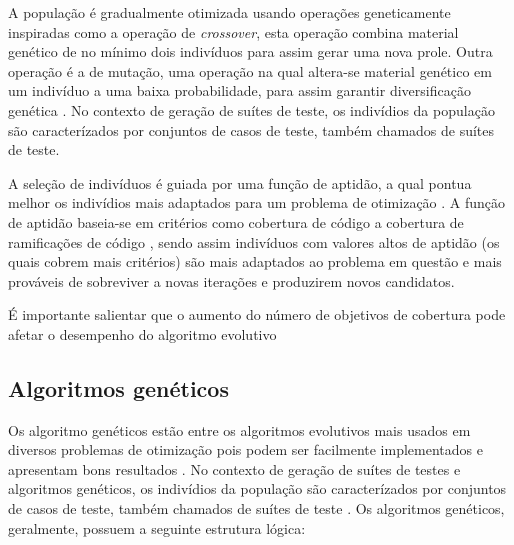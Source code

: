 \documentclass[
	12pt,				%
	oneside,			%
	a4paper,			%
	english,			%
	brazil				%
	]{abntex2ppgsi}
\begin{document}
A população é gradualmente otimizada usando operações geneticamente inspiradas como a operação de \textit{crossover}, esta operação combina material genético de no mínimo dois indivíduos para assim gerar uma nova prole. Outra operação é a de mutação, uma operação na qual altera-se material genético em um indivíduo a uma baixa probabilidade, para assim garantir diversificação genética \cite{Campos2017}. No contexto de geração de suítes de teste, os indivídios da população são caracterízados por conjuntos de casos de teste, também chamados de suítes de teste. \cite{Campos2017}


A seleção de indivíduos é guiada por uma função de aptidão, a qual pontua melhor  os indivídios mais adaptados para um problema de otimização \cite{Campos2017}. A função de aptidão baseia-se em critérios como cobertura de código a cobertura de ramificações de código \cite{Campos2017}, sendo assim indivíduos com valores altos de aptidão (os quais cobrem mais critérios) são mais adaptados ao problema em questão e mais prováveis de sobreviver a novas iterações e produzirem novos candidatos. \cite{Campos2017}

É importante salientar que o aumento do número de objetivos de cobertura pode afetar o desempenho do algoritmo evolutivo \cite{Campos2017}

\subsection{Algoritmos genéticos}

Os algoritmo genéticos estão entre os algoritmos evolutivos mais usados em diversos problemas de otimização pois podem ser facilmente implementados e apresentam bons resultados  \cite{Campos2017}.  No contexto de geração de suítes de testes e algoritmos genéticos, os indivídios da população são caracterízados por conjuntos de casos de teste, também chamados de suítes de teste \cite{Campos2017}. Os algoritmos genéticos,  geralmente, possuem a seguinte estrutura lógica: \\
\end{document}
